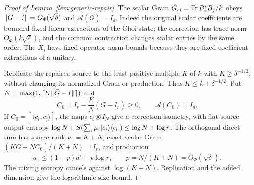 \begin{proof}[Proof of Lemma~\ref{lem:generic-repair}]
The scalar Gram $\bar G_{ij}=\operatorname{Tr} B_i^*B_j/k$ obeys
$\lVert \bar G-I\rVert=O_\Phi(\sqrt\delta)$ and $\mathcal A(\bar G)=I_d$.
Indeed the original scalar coefficients are bounded fixed linear extractions of the Choi state; the correction has trace norm
$O_\Phi(k\sqrt\ell)$, and the common contraction changes scalar entries by the same order.
The $X_i$ have fixed operator-norm bounds because they are fixed coefficient extractions of a unitary.

Replicate the repaired source to the least positive multiple $K$ of $k$ with $K\ge\delta^{-1/2}$, without changing its normalized Gram or production. Thus $K\le k+\delta^{-1/2}$.
Put $N=\max(1,\lceil K\lVert \bar G-I\rVert\rceil)$ and
\[
 C_0=I_r-\frac K N(\bar G-I_r)\ge0,\qquad \mathcal A(C_0)=I_d.
\]
If $C_0=[\langle c_i,c_j\rangle]$, the maps $c_i\otimes I_N$ give a correction isometry, with flat-source output entropy
$\log N+S(\sum_i\mu_i\lvert c_i\rangle\langle c_i\rvert)\le\log N+\log r$.
The orthogonal direct sum has source rank $k_1=K+N$, exact scalar Gram
$(K\bar G+NC_0)/(K+N)=I_r$, and production
\[
 a_1\le(1-p)a'+p\log r,\qquad p=N/(K+N)=O_\Phi(\sqrt\delta).
\]
The mixing entropy cancels against $\log(K+N)$. Replication and the added dimension give the logarithmic size bound.
\end{proof}

